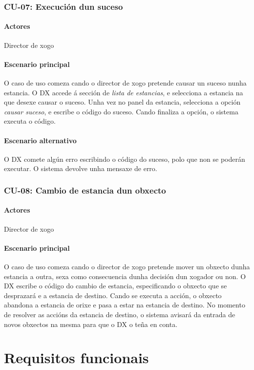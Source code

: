 \subsubsection{CU-07: Execución dun suceso}
\paragraph{Actores}
Director de xogo
\paragraph{Escenario principal}
O caso de uso comeza cando o director de xogo pretende causar un suceso nunha estancia. O DX accede á sección de {\it lista de estancias}, e selecciona a estancia na que desexe causar o suceso. Unha vez no panel da estancia, selecciona a opción {\it causar suceso}, e escribe o código do suceso. Cando finaliza a opción, o sistema executa o código.

\paragraph{Escenario alternativo}
O DX comete algún erro escribindo o código do suceso, polo que non se poderán executar. O sistema devolve unha mensaxe de erro.

\subsubsection{CU-08: Cambio de estancia dun obxecto}
\paragraph{Actores}
Director de xogo
\paragraph{Escenario principal}
O caso de uso comeza cando o director de xogo pretende mover un obxecto dunha estancia a outra, sexa como consecuencia dunha decisión dun xogador ou non. O DX escribe o código do cambio de estancia, especificando o obxecto que se desprazará e a estancia de destino. Cando se executa a acción, o obxecto abandona a estancia de orixe e pasa a estar na estancia de destino. No momento de resolver as accións da estancia de destino, o sistema avisará da entrada de novos obxectos na mesma para que o DX o teña en conta.


\section{Requisitos funcionais}
